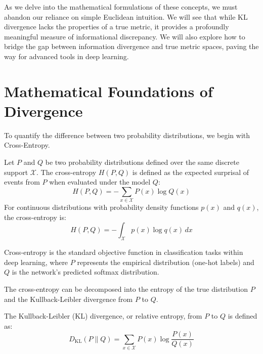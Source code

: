 As we delve into the mathematical formulations of these concepts, we must abandon our reliance on simple Euclidean intuition. We will see that while KL divergence lacks the properties of a true metric, it provides a profoundly meaningful measure of informational discrepancy. We will also explore how to bridge the gap between information divergence and true metric spaces, paving the way for advanced tools in deep learning.

\section{Mathematical Foundations of Divergence}

To quantify the difference between two probability distributions, we begin with Cross-Entropy.

\begin{definition}
Let $P$ and $Q$ be two probability distributions defined over the same discrete support $\mathcal{X}$. The cross-entropy $H(P, Q)$ is defined as the expected surprisal of events from $P$ when evaluated under the model $Q$:
\begin{equation}
H(P, Q) = -\sum_{x \in \mathcal{X}} P(x) \log Q(x)
\end{equation}
For continuous distributions with probability density functions $p(x)$ and $q(x)$, the cross-entropy is:
\begin{equation}
H(P, Q) = -\int_{\mathcal{X}} p(x) \log q(x) \, dx
\end{equation}
\end{definition}

Cross-entropy is the standard objective function in classification tasks within deep learning, where $P$ represents the empirical distribution (one-hot labels) and $Q$ is the network's predicted softmax distribution.

The cross-entropy can be decomposed into the entropy of the true distribution $P$ and the Kullback-Leibler divergence from $P$ to $Q$.

\begin{definition}
The Kullback-Leibler (KL) divergence, or relative entropy, from $P$ to $Q$ is defined as:
\begin{equation}
D_{\text{KL}}(P \parallel Q) = \sum_{x \in \mathcal{X}} P(x) \log \frac{P(x)}{Q(x)}
\end{equation}
\end{definition}

